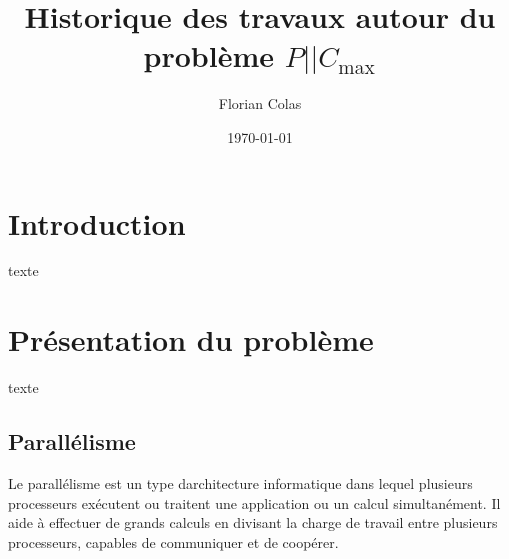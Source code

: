 \documentclass[a4paper,12pt]{report}
\title{Historique des travaux autour du problème $P||C_{\max}$}
\author{Florian Colas}
\date{\today}
\theoremstyle{plain}				%
\theoremstyle{definition}				%
\begin{document}
\maketitle

%
%
%
\renewcommand{\thesection}{\arabic{section}}
\renewcommand{\contentsname}{Sommaire}
\setcounter{tocdepth}{4}	%
\setcounter{secnumdepth}{3}	%
\tableofcontents

\section{Introduction}

texte


\section{Présentation du problème}
texte
\subsection{Parallélisme}
Le parallélisme est un type d{\textquotesingle}architecture informatique
dans lequel plusieurs processeurs exécutent ou traitent une application
ou un calcul simultanément. Il aide à effectuer de grands calculs en
divisant la charge de travail entre plusieurs processeurs, capables de communiquer et de coopérer.
\end{document}
